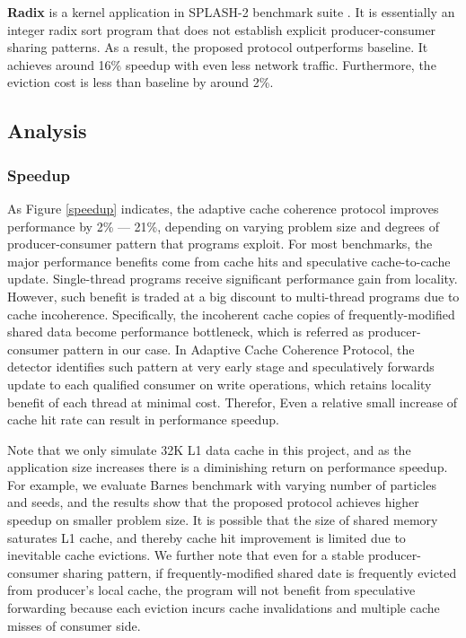 \documentclass[11pt,conference]{IEEEtran}
\begin{document}
\textbf{Radix} is a kernel application in SPLASH-2 benchmark suite \cite{splash}. It is essentially an integer radix sort program that does not establish explicit producer-consumer sharing patterns. As a result, the proposed protocol outperforms baseline. It achieves around 16\% speedup with even less network traffic. Furthermore, the eviction cost is less than baseline by around 2\%.


\subsection{Analysis}

\subsubsection{Speedup}
As Figure \ref{speedup} indicates, the adaptive cache coherence protocol improves performance by 2\% --- 21\%, depending on varying problem size and degrees of producer-consumer pattern that programs exploit. For most benchmarks, the major performance benefits come from cache hits and speculative cache-to-cache update. Single-thread programs receive significant performance gain from locality. However, such benefit is traded at a big discount to multi-thread programs due to cache incoherence. Specifically, the incoherent cache copies of frequently-modified shared data become performance bottleneck, which is referred as producer-consumer pattern in our case. In Adaptive Cache Coherence Protocol, the detector identifies such pattern at very early stage and speculatively forwards update to each qualified consumer on write operations, which retains locality benefit of each thread at minimal cost. Therefor, Even a relative small increase of cache hit rate can result in performance speedup.

Note that we only simulate 32K L1 data cache in this project, and as the application size increases there is a diminishing return on performance speedup. For example, we evaluate Barnes benchmark with varying number of particles and seeds, and the results show that the proposed protocol achieves higher speedup on smaller problem size. It is possible that the size of shared memory saturates L1 cache, and thereby cache hit improvement is limited due to inevitable cache evictions. We further note that even for a stable producer-consumer sharing pattern, if frequently-modified shared date is frequently evicted from producer's local cache, the program will not benefit from speculative forwarding because each eviction incurs cache invalidations and multiple cache misses of consumer side.
\end{document}
